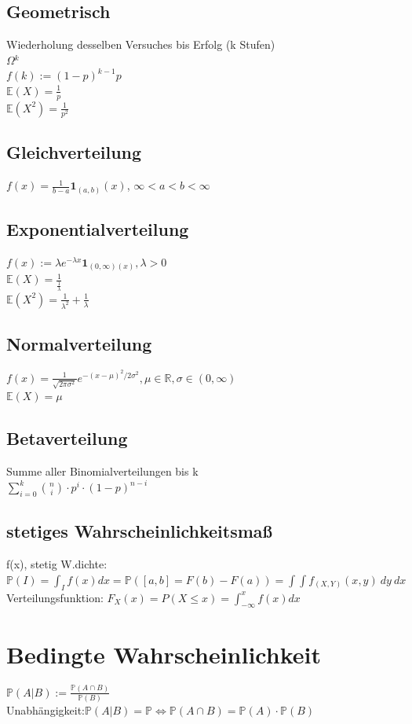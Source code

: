 \documentclass[]{article}
\begin{document}
\subsection{Geometrisch}
Wiederholung desselben Versuches bis Erfolg (k Stufen)\\
$\Omega$$^k$\\
$f(k):=(1-p)^{k-1}p$\\
$\mathbb{E}(X)=\frac{1}{p}$\\
$\mathbb{E}(X^2)=\frac{1}{p^2}$
\subsection{Gleichverteilung}$f(x)=\frac{1}{b-a}\mathbf{1}_{(a,b)}(x)$, $ \infty <a<b<\infty$
\subsection{Exponentialverteilung}
$f(x):=\lambda e^{-\lambda x} \mathbf{1}_{(0,\infty)(x)}, \lambda >0$\\
$\mathbb{E}(X)=\frac{1}{\frac{1}{\lambda}}$\\
$\mathbb{E}(X^2)=\frac{1}{\lambda^2}+\frac{1}{\lambda}$
\subsection{Normalverteilung}
$f(x)=\frac{1}{ \sqrt{2 \pi \sigma^2} } e^{-(x-\mu)^2 /2\sigma^2}, \mu \in \mathbb{R}, \sigma \in(0,\infty)$\\
$\mathbb{E}(X)=\mu$
\subsection{Betaverteilung}
Summe aller Binomialverteilungen bis k\\
$\sum_{i=0}^k \binom{n}{i} \cdot p^i \cdot (1-p)^{n-i} $
\subsection{stetiges Wahrscheinlichkeitsmaß}
f(x), stetig W.dichte: \\
$\mathbb{P}(I)=\int_I f(x)dx=\mathbb{P}([a,b]=F(b)-F(a)) =\int \int f_{(X,Y)}(x,y)\ 
dy\ dx$ \\
Verteilungsfunktion: $F_X(x)=P(X\leq x)=\int_{-\infty}^x f(x) dx$
\section{Bedingte Wahrscheinlichkeit}
$\mathbb{P}(A|B):=\frac{\mathbb{P}(A\cap B)}{\mathbb{P}(B)}$\\
Unabhängigkeit:$\mathbb{P}(A|B)=\mathbb{P} \Leftrightarrow \mathbb{P}(A \cap B)=\mathbb{P}(A) \cdot \mathbb{P}(B)$ 
\end{document}
